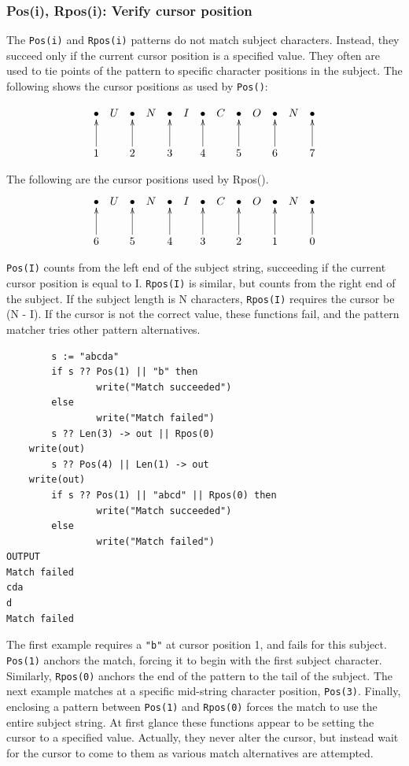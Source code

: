 \documentclass[letterpaper,12pt]{article}
\begin{document}
\subsubsection{Pos(i), Rpos(i): Verify cursor position}

The {\tt Pos(i)} and {\tt Rpos(i)} patterns do not match subject
characters. Instead, they succeed only if the current cursor position
is a specified value. They often are used to tie points of the pattern
to specific character positions in the subject. The following shows
the cursor positions as used by {\tt Pos()}:

\begin{displaymath}
\xymatrix@C=4pt{ \bullet & U &  \bullet & N &  \bullet & I &  \bullet & C & \bullet  & O &  \bullet & N &  \bullet \\
	  1 \ar[u] &   & 2 \ar[u] &   & 3 \ar[u] &   & 4 \ar[u] &   & 5 \ar[u] &   & 6 \ar[u] &   & 7 \ar[u]
	}
\end{displaymath}

The following are the cursor positions used by Rpos().
\begin{displaymath}
\xymatrix@C=4pt{ \bullet & U &  \bullet & N &  \bullet & I &  \bullet & C & \bullet  & O &  \bullet & N &  \bullet \\
	  6 \ar[u] &   & 5 \ar[u] &   & 4 \ar[u] &   & 3 \ar[u] &   & 2 \ar[u] &   & 1 \ar[u] &   & 0 \ar[u]
	}
\end{displaymath}

{\tt Pos(I)} counts from the left end of the subject string, succeeding if
the current cursor position is equal to I. {\tt Rpos(I)} is similar, but
counts from the right end of the subject. If the subject length is N
characters, {\tt Rpos(I)} requires the cursor be (N - I). If the cursor is
not the correct value, these functions fail, and the pattern matcher
tries other pattern alternatives.

\begin{verbatim}
        s := "abcda"
        if s ?? Pos(1) || "b" then
                write("Match succeeded")
        else
                write("Match failed")
        s ?? Len(3) -> out || Rpos(0) 
	write(out)
        s ?? Pos(4) || Len(1) -> out
	write(out)
        if s ?? Pos(1) || "abcd" || Rpos(0) then
                write("Match succeeded")
        else
                write("Match failed")
OUTPUT
Match failed
cda
d
Match failed
\end{verbatim}

The first example requires a {\tt "b"} at cursor position 1, and fails for
this subject. {\tt Pos(1)} anchors the match, forcing it to begin with the
first subject character. Similarly, {\tt Rpos(0)} anchors the end of the
pattern to the tail of the subject. The next example matches at a
specific mid-string character position, {\tt Pos(3)}. Finally, enclosing a
pattern between {\tt Pos(1)} and {\tt Rpos(0)} forces the match to use the
entire subject string.  At first glance these functions appear to be
setting the cursor to a specified value. Actually, they never alter
the cursor, but instead wait for the cursor to come to them as various
match alternatives are attempted.
\end{document}

